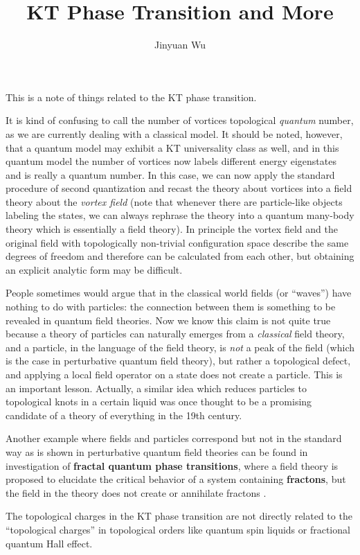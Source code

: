 \documentclass[hyperref, a4paper]{article}
\title{KT Phase Transition and More}
\author{Jinyuan Wu}
\newcommand*{\concept}[1]{{\textbf{#1}}}
\begin{document}
\maketitle

This is a note of things related to the KT phase transition.

It is kind of confusing to call the number of vortices topological \emph{quantum} number, as we are currently dealing with a classical model.
It should be noted, however, that a quantum model may exhibit a KT universality class as well, and in this quantum model the number of vortices now labels different energy eigenstates and is really a quantum number.
In this case, we can now apply the standard procedure of second quantization and recast the theory about vortices into a field theory about the \emph{vortex field} (note that whenever there are particle-like objects labeling the states, we can always rephrase the theory into a quantum many-body theory which is essentially a field theory).
In principle the vortex field and the original field with topologically non-trivial configuration space describe the same degrees of freedom and therefore can be calculated from each other, but obtaining an explicit analytic form may be difficult.

People sometimes would argue that in the classical world fields (or ``waves'') have nothing to do with particles: the connection between them is something to be revealed in quantum field theories.
Now we know this claim is not quite true because a theory of particles can naturally emerges from a \emph{classical} field theory, and a particle, in the language of the field theory, is \emph{not} a peak of the field (which is the case in perturbative quantum field theory), but rather a topological defect, and applying a local field operator on a state does not create a particle.
This is an important lesson.
Actually, a similar idea which reduces particles to topological knots in a certain liquid was once thought to be a promising candidate of a theory of everything in the 19th century.

Another example where fields and particles correspond but not in the standard way as is shown in perturbative quantum field theories can be found in investigation of \concept{fractal quantum phase transitions}, where a field theory is proposed to elucidate the critical behavior of a system containing \concept{fractons}, but the field in the theory does not create or annihilate fractons \cite{zhou2021fractal}.

The topological charges in the KT phase transition are not directly related to the ``topological charges'' in topological orders like quantum spin liquids or fractional quantum Hall effect.


 
\end{document}
